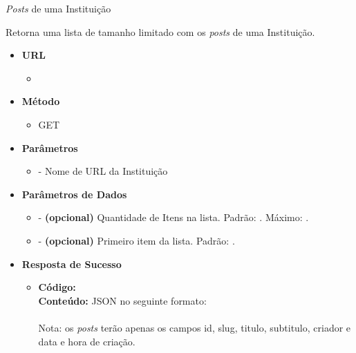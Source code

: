 
\begin{caixa}{\emph{Posts} de uma Instituição}{}

Retorna uma lista de tamanho limitado com os \emph{posts} de uma Instituição.

\begin{itemize}
\item \textbf{URL}
	\begin{itemize}
		\item {}
	\end{itemize}

\item \textbf{Método}
	\begin{itemize}
		\item GET
	\end{itemize}

\item \textbf{Parâmetros}
	\begin{itemize}
		\item {} - Nome de URL da Instituição
	\end{itemize}

\item \textbf{Parâmetros de Dados}
	\begin{itemize}
		\item {} - \textbf{(opcional)} Quantidade de Itens na lista. Padrão: . Máximo: .
        \item {} - \textbf{(opcional)} Primeiro item da lista. Padrão: .
	\end{itemize}

\item \textbf{Resposta de Sucesso}
	\begin{itemize}
		\item \textbf{Código:}  \\ \textbf{Conteúdo:} JSON no seguinte formato: \\  \\
        Nota: os \emph{posts} terão apenas os campos id, slug, titulo, subtitulo, criador e data e hora de criação.
	\end{itemize}


\end{itemize}
\end{caixa}
